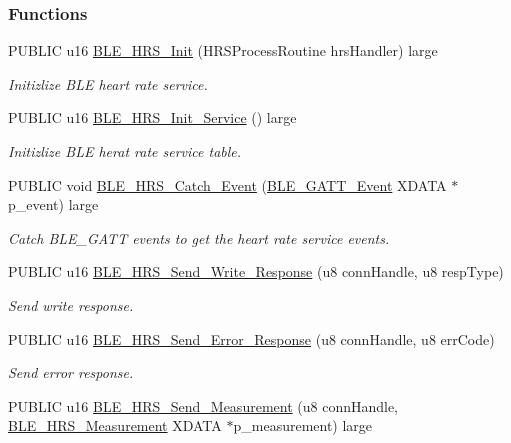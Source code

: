 \subsubsection*{Functions}
\begin{DoxyCompactItemize}
\item 
P\+U\+B\+L\+IC u16 \hyperlink{group___b_l_e___h_r_s_ga69d4b66132dd0c28c6f8a0711f255b4b}{B\+L\+E\+\_\+\+H\+R\+S\+\_\+\+Init} (H\+R\+S\+Process\+Routine hrs\+Handler) large
\begin{DoxyCompactList}\small\item\em Initizlize B\+LE heart rate service. \end{DoxyCompactList}\item 
P\+U\+B\+L\+IC u16 \hyperlink{group___b_l_e___h_r_s_gafe6fcac37c742b2354fb7ea48c6725fd}{B\+L\+E\+\_\+\+H\+R\+S\+\_\+\+Init\+\_\+\+Service} () large
\begin{DoxyCompactList}\small\item\em Initizlize B\+LE herat rate service table. \end{DoxyCompactList}\item 
P\+U\+B\+L\+IC void \hyperlink{group___b_l_e___h_r_s_ga231c9def69b1156f60ef8489ef6e2051}{B\+L\+E\+\_\+\+H\+R\+S\+\_\+\+Catch\+\_\+\+Event} (\hyperlink{struct_b_l_e___g_a_t_t___event}{B\+L\+E\+\_\+\+G\+A\+T\+T\+\_\+\+Event} X\+D\+A\+TA $\ast$p\+\_\+event) large
\begin{DoxyCompactList}\small\item\em Catch B\+L\+E\+\_\+\+G\+A\+TT events to get the heart rate service events. \end{DoxyCompactList}\item 
P\+U\+B\+L\+IC u16 \hyperlink{group___b_l_e___h_r_s_ga5e1c2ff7ad51a0271425c03aca1ac4fe}{B\+L\+E\+\_\+\+H\+R\+S\+\_\+\+Send\+\_\+\+Write\+\_\+\+Response} (u8 conn\+Handle, u8 resp\+Type)
\begin{DoxyCompactList}\small\item\em Send write response. \end{DoxyCompactList}\item 
P\+U\+B\+L\+IC u16 \hyperlink{group___b_l_e___h_r_s_gaecdf24d2d792679c29e7d76a5f551991}{B\+L\+E\+\_\+\+H\+R\+S\+\_\+\+Send\+\_\+\+Error\+\_\+\+Response} (u8 conn\+Handle, u8 err\+Code)
\begin{DoxyCompactList}\small\item\em Send error response. \end{DoxyCompactList}\item 
P\+U\+B\+L\+IC u16 \hyperlink{group___b_l_e___h_r_s_gae9b00ae197312e7174ed41527750f89f}{B\+L\+E\+\_\+\+H\+R\+S\+\_\+\+Send\+\_\+\+Measurement} (u8 conn\+Handle, \hyperlink{struct_b_l_e___h_r_s___measurement}{B\+L\+E\+\_\+\+H\+R\+S\+\_\+\+Measurement} X\+D\+A\+TA $\ast$p\+\_\+measurement) large

\end{DoxyCompactItemize}
